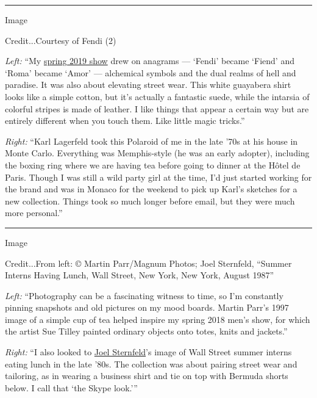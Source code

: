 \begin{center}\rule{0.5\linewidth}{\linethickness}\end{center}

Image

Credit...Courtesy of Fendi (2)

\emph{Left:} ``My
\href{https://www.nytimes.com/slideshow/2018/09/20/fashion/runway-womens/fendi-spring-2019.html}{spring
2019 show} drew on anagrams --- `Fendi' became `Fiend' and `Roma' became
`Amor' --- alchemical symbols and the dual realms of hell and paradise.
It was also about elevating street wear. This white guayabera shirt
looks like a simple cotton, but it's actually a fantastic suede, while
the intarsia of colorful stripes is made of leather. I like things that
appear a certain way but are entirely different when you touch them.
Like little magic tricks.''

\emph{Right:} ``Karl Lagerfeld took this Polaroid of me in the late '70s
at his house in Monte Carlo. Everything was Memphis-style (he was an
early adopter), including the boxing ring where we are having tea before
going to dinner at the Hôtel de Paris. Though I was still a wild party
girl at the time, I'd just started working for the brand and was in
Monaco for the weekend to pick up Karl's sketches for a new collection.
Things took so much longer before email, but they were much more
personal.''

\begin{center}\rule{0.5\linewidth}{\linethickness}\end{center}

Image

Credit...From left: © Martin Parr/Magnum Photos; Joel Sternfeld,
``Summer Interns Having Lunch, Wall Street, New York, New York, August
1987''

\emph{Left:} ``Photography can be a fascinating witness to time, so I'm
constantly pinning snapshots and old pictures on my mood boards. Martin
Parr's 1997 image of a simple cup of tea helped inspire my spring 2018
men's show, for which the artist Sue Tilley painted ordinary objects
onto totes, knits and jackets.''

\emph{Right:} ``I also looked to
\href{https://www.nytimes.com/2017/01/24/t-magazine/art/joel-sternfeld-photographs.html}{Joel
Sternfeld}'s image of Wall Street summer interns eating lunch in the
late '80s. The collection was about pairing street wear and tailoring,
as in wearing a business shirt and tie on top with Bermuda shorts below.
I call that `the Skype look.'''

